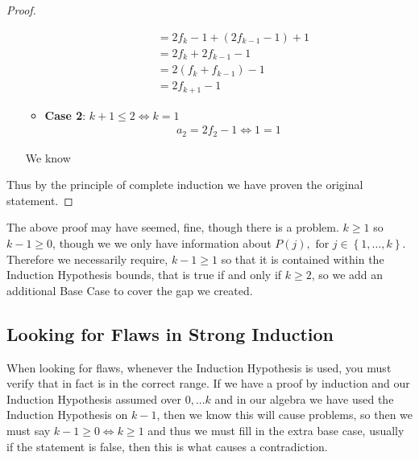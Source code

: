 \documentclass[11pt]{book}
\begin{document}
\begin{proof}
\begin{itemize}
\begin{itemize}
\begin{align*}
                        &= 2f_{k}  - 1 + \left( 2f_{k - 1}  - 1 \right)  + 1\\
                        &= 2f_{k}  + 2f_{k - 1}  - 1  \\ 
                        &= 2\left( f_{k}  + f_{k - 1}  \right)  - 1 \\
                        &= 2f_{k + 1} -1 
                    \end{align*}
                \item \textbf{Case 2}: $k + 1 \le 2 \Leftrightarrow k = 1$
                    \begin{align*}
                        a_{2} = 2f_{2}  - 1 \Leftrightarrow 1= 1
                    \end{align*}
            \end{itemize}
            We know 
    \end{itemize}
    Thus by the principle of complete induction we have proven the original statement.
\end{proof}

The above proof may have seemed, fine, though there is a problem. $k \ge 1$ so $k - 1 \ge 0$, though we we only have information about $P\left(j\right) , \text{ for } j \in \left\{ 1, \ldots , k \right\} $. Therefore we necessarily require, $k - 1 \ge 1$ so that it is contained within the Induction Hypothesis bounds, that is true if and only if $k \ge 2$, so we add an additional Base Case to cover the gap we created.

\subsection{Looking for Flaws in Strong Induction}%
\label{sub:looking_for_flaws_in_strong_induction}

When looking for flaws, whenever the Induction Hypothesis is used, you must verify that in fact is in the correct range. If we have a proof by induction and our Induction Hypothesis assumed over $0, \ldots k$ and in our algebra we have used the Induction Hypothesis on $k  - 1$,  then we know this will cause problems, so then we must say $k  - 1 \ge 0 \Leftrightarrow k \ge 1$ and thus we must fill in the extra base case, usually if the statement is false, then this is what causes a contradiction.


\end{document}
